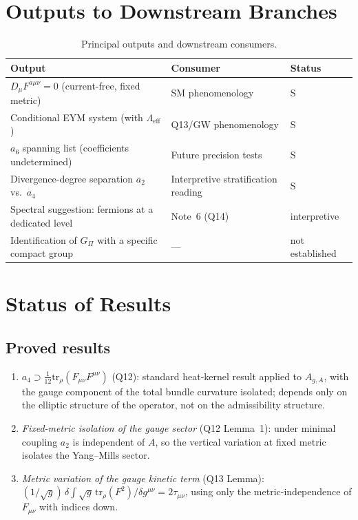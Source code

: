 \documentclass[11pt,a4paper]{article}
\theoremstyle{definition}
\newcommand{\Gpi}{G_\Pi}
\begin{document}
  \section{Outputs to Downstream Branches}
    \label{sec:outputs}

    \begin{table}[ht]
      \centering
      \caption{Principal outputs and downstream consumers.}
      \label{tab:outputs}
      \renewcommand{\arraystretch}{1.3}
      \begin{tabular}{@{}p{5.5cm}p{4.5cm}l@{}}
        \toprule
        Output & Consumer & Status \\
        \midrule
        $D_\mu F^{a\mu\nu} = 0$ (current-free, fixed metric) & SM phenomenology & S \\
        Conditional EYM system (with $\Lambda_{\mathrm{eff}}$)
        & Q13/GW phenomenology & S \\
        $a_6$ spanning list (coefficients undetermined) & Future precision tests & S \\
        Divergence-degree separation $a_2$ vs.\ $a_4$ & Interpretive stratification reading & S \\
        Spectral suggestion: fermions at a dedicated level & Note~6 (Q14) & interpretive \\
        Identification of $\Gpi$ with a specific compact group & --- & not established \\
        \bottomrule
      \end{tabular}
    \end{table}

  \section{Status of Results}
    \label{sec:status}

    \subsection{Proved results}
      \label{sec:proved}

      \begin{enumerate}
        \item \textit{$a_4 \supset \frac{1}{12}\mathrm{tr}_\rho(F_{\mu\nu}F^{\mu\nu})$}
        (Q12): standard heat-kernel result applied to $A_{g,A}$, with the gauge component of the
        total bundle curvature isolated; depends only on the elliptic structure of the operator,
        not on the admissibility structure.

        \item \textit{Fixed-metric isolation of the gauge sector} (Q12 Lemma~1): under minimal
        coupling $a_2$ is independent of $A$, so the vertical variation at fixed metric isolates
        the Yang--Mills sector.

        \item \textit{Metric variation of the gauge kinetic term} (Q13 Lemma):
        $(1/\sqrt{g})\,\delta\!\int\!\sqrt{g}\,\mathrm{tr}_\rho(F^2)/\delta g^{\mu\nu}
        = 2\tau_{\mu\nu}$, using only the metric-independence of $F_{\mu\nu}$ with indices down.
      \end{enumerate}
\end{document}
